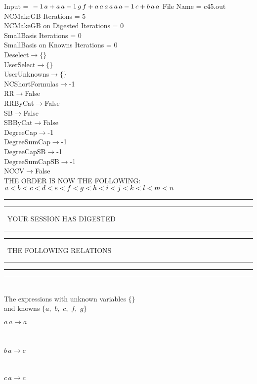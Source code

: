 \documentclass[rep10,leqno]{report}
\begin{document}
\normalsize
\baselineskip=12pt
\noindent
Input = 
$
\\-1\,
 a + a\,
 a\\
-1\,
 g\,
 f + a\,
 a\,
 a\,
 a\,
 a\,
 a\\
-1\,
 c + b\,
 a\,
 a\\
$
File Name = c45.out\\
NCMakeGB Iterations = 5\\
NCMakeGB on Digested Iterations = 0\\
SmallBasis Iterations = 0\\
SmallBasis on Knowns Iterations = 0\\
Deselect$\rightarrow \{\}$\\
UserSelect$\rightarrow \{\}$\\
UserUnknowns$\rightarrow \{\}$\\
NCShortFormulas$\rightarrow$-1\\
RR$\rightarrow $False\\
RRByCat$\rightarrow $False\\
SB$\rightarrow $False\\
SBByCat$\rightarrow $False\\
DegreeCap$\rightarrow $-1\\
DegreeSumCap$\rightarrow $-1\\
DegreeCapSB$\rightarrow $-1\\
DegreeSumCapSB$\rightarrow $-1\\
NCCV$\rightarrow $False\\
THE ORDER IS NOW THE FOLLOWING:\hfil\break
$
a<b<c<d<e<f<g<h<i<j<k<l<m<n\\
$
\rule[2pt]{6in}{4pt}\hfil\break
\rule[2pt]{1.879in}{4pt}
\ YOUR SESSION HAS DIGESTED\ 
\rule[2pt]{1.879in}{4pt}\hfil\break
\rule[2pt]{1.923in}{4pt}
\ THE FOLLOWING RELATIONS\ 
\rule[2pt]{1.923in}{4pt}\hfil\break
\rule[2pt]{6in}{4pt}\hfil\break
\rule[3pt]{6in}{.7pt}\\
The expressions with unknown variables $\{\}$\\
and knowns $\{a,
$ $
b,
$ $
c,
$ $
f,
$ $
g\}$\smallskip\\
\begin{minipage}{6in}
$
a\,
 a\rightarrow a
$
\end{minipage}\medskip \\
\begin{minipage}{6in}
$
b\,
 a\rightarrow c
$
\end{minipage}\medskip \\
\begin{minipage}{6in}
$
c\,
 a\rightarrow c
$
\end{minipage}\medskip \\
\end{document}
